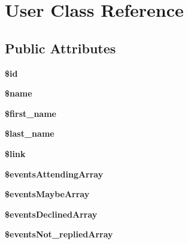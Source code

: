 \hypertarget{class_user}{
\section{User Class Reference}
\label{class_user}
}
\subsection*{Public Attributes}
\begin{DoxyCompactItemize}
\item 
\hypertarget{class_user_a440b33833fb19a5caeb85b2e8eae3656}{
{\bfseries \$id}}
\label{class_user_a440b33833fb19a5caeb85b2e8eae3656}

\item 
\hypertarget{class_user_ae667f163668e10bcaaaf10113854dd69}{
{\bfseries \$name}}
\label{class_user_ae667f163668e10bcaaaf10113854dd69}

\item 
\hypertarget{class_user_adc3afd1a0e937ab0dde77e3b9ef07e6a}{
{\bfseries \$first\_\-name}}
\label{class_user_adc3afd1a0e937ab0dde77e3b9ef07e6a}

\item 
\hypertarget{class_user_af1734e4928262eb9f1bd3b5aca4bdd9e}{
{\bfseries \$last\_\-name}}
\label{class_user_af1734e4928262eb9f1bd3b5aca4bdd9e}

\item 
\hypertarget{class_user_a46faedc278f8f2f58c9a5f6e6e5ea2d6}{
{\bfseries \$link}}
\label{class_user_a46faedc278f8f2f58c9a5f6e6e5ea2d6}

\item 
\hypertarget{class_user_a964cd277172f2806eb55151d58cdfa9b}{
{\bfseries \$eventsAttendingArray}}
\label{class_user_a964cd277172f2806eb55151d58cdfa9b}

\item 
\hypertarget{class_user_a9c6c96b3721cf2181a51b441e25e03ba}{
{\bfseries \$eventsMaybeArray}}
\label{class_user_a9c6c96b3721cf2181a51b441e25e03ba}

\item 
\hypertarget{class_user_a3b4062fcfe866cd085d0dd7ec51595de}{
{\bfseries \$eventsDeclinedArray}}
\label{class_user_a3b4062fcfe866cd085d0dd7ec51595de}

\item 
\hypertarget{class_user_a268dca59f93004384970a89b45336909}{
{\bfseries \$eventsNot\_\-repliedArray}}
\label{class_user_a268dca59f93004384970a89b45336909}

\end{DoxyCompactItemize}


